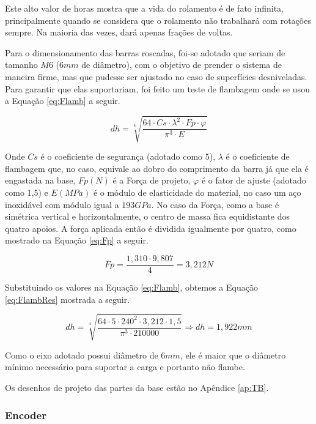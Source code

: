 \documentclass[
	12pt,				%
	openany,			%
	twoside,			%
	a4paper,			%
	english,			%
	french,				%
	spanish,			%
	brazil,				%
	oldfontcommands
	]{abntex2}
\begin{document}
Este alto valor de horas mostra que a vida do rolamento é de fato infinita, principalmente quando se considera que o rolamento não trabalhará com rotações sempre. Na maioria das vezes, dará apenas frações de voltas.

Para o dimensionamento das barras roscadas, foi-se adotado que seriam de tamanho $M6$ ($6mm$ de diâmetro), com o objetivo de prender o sistema de maneira firme, mas que pudesse ser ajustado no caso de superfícies desniveladas. Para garantir que elas suportariam, foi feito um teste de flambagem onde se usou a Equação \ref{eq:Flamb} a seguir.

\begin{equation}
dh = \sqrt[4]{ \frac{64 \cdot Cs \cdot \lambda^{2} \cdot Fp \cdot \varphi }{ \pi^{3} \cdot E } }
\label{eq:Flamb}
\end{equation}

Onde $Cs$ é o coeficiente de segurança (adotado como 5), $\lambda$ é o coeficiente de flambagem que, no caso, equivale ao dobro do comprimento da barra já que ela é engastada na base, $Fp(N)$ é a Força de projeto, $\varphi$ é o fator de ajuste (adotado como 1,5) e $E(MPa)$ é o módulo de elasticidade do material, no caso um aço inoxidável com módulo igual a $193GPa$. No caso da Força, como a base é simétrica vertical e horizontalmente, o centro de massa fica equidistante dos quatro apoios. A força aplicada então é dividida igualmente por quatro, como mostrado na Equação \ref{eq:Fp} a seguir.

\begin{equation}
Fp = \frac{1,310 \cdot 9,807}{4} = 3,212 N
\label{eq:Fp}
\end{equation}

Substituindo os valores na Equação \ref{eq:Flamb}, obtemos a Equação \ref{eq:FlambRes} mostrada a seguir.

\begin{equation}
dh = \sqrt[4]{ \frac{64 \cdot 5 \cdot 240^{2} \cdot 3,212 \cdot 1,5 }{ \pi^{3} \cdot 210000 } } \Longrightarrow dh = 1,922 mm
\label{eq:FlambRes}
\end{equation}

Como o eixo adotado possui diâmetro de $6mm$, ele é maior que o diâmetro mínimo necessário para suportar a carga e portanto não flambe.

Os desenhos de projeto das partes da base estão no Apêndice \ref{ap:TB}.

\subsubsection{Encoder}
\end{document}
